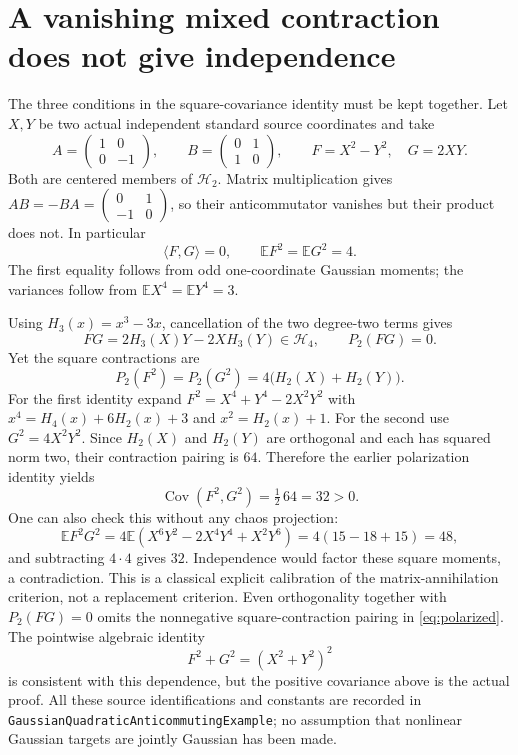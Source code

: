\documentclass[11pt]{article}
\newcommand{\E}{\mathbb E}
\newcommand{\Hh}{\mathcal H}
\newcommand{\Cov}{\operatorname{Cov}}
\begin{document}
\section{A vanishing mixed contraction does not give independence}\label{sec:anticommuting}
The three conditions in the square-covariance identity must be kept
together. Let $X,Y$ be two actual independent standard source
coordinates and take
\[
 A=\begin{pmatrix}1&0\\0&-1\end{pmatrix},\qquad
 B=\begin{pmatrix}0&1\\1&0\end{pmatrix},\qquad
 F=X^2-Y^2,\quad G=2XY.
\]
Both are centered members of $\Hh_2$. Matrix multiplication gives
$AB=-BA=\left(\begin{smallmatrix}0&1\\-1&0\end{smallmatrix}\right)$,
so their anticommutator vanishes but their product does not.
In particular
\[
 \langle F,G\rangle=0,\qquad \E F^2=\E G^2=4.
\]
The first equality follows from odd one-coordinate Gaussian moments;
the variances follow from $\E X^4=\E Y^4=3$.

Using $H_3(x)=x^3-3x$, cancellation of the two degree-two terms gives
\[
 FG=2H_3(X)Y-2XH_3(Y)\in\Hh_4,\qquad P_2(FG)=0.
\]
Yet the square contractions are
\[
 P_2(F^2)=P_2(G^2)=4\bigl(H_2(X)+H_2(Y)\bigr).
\]
For the first identity expand $F^2=X^4+Y^4-2X^2Y^2$ with
$x^4=H_4(x)+6H_2(x)+3$ and $x^2=H_2(x)+1$.
For the second use $G^2=4X^2Y^2$. Since $H_2(X)$ and $H_2(Y)$
are orthogonal and each has squared norm two, their contraction
pairing is $64$. Therefore the earlier polarization identity yields
\begin{equation}\label{eq:anticommutingcovariance}
 \Cov(F^2,G^2)=\tfrac12\,64=32>0.
\end{equation}
One can also check this without any chaos projection:
\[
 \E F^2G^2=4\E(X^6Y^2-2X^4Y^4+X^2Y^6)
 =4(15-18+15)=48,
\]
and subtracting $4\cdot4$ gives $32$. Independence would factor
these square moments, a contradiction. This is a classical explicit
calibration of the matrix-annihilation criterion, not a replacement
criterion. Even orthogonality together with $P_2(FG)=0$ omits the
nonnegative square-contraction pairing in \eqref{eq:polarized}.
The pointwise algebraic identity
\[
 F^2+G^2=(X^2+Y^2)^2
\]
is consistent with this dependence, but the positive covariance above
is the actual proof. All these source identifications and constants
are recorded in \texttt{GaussianQuadraticAnticommutingExample};
no assumption that nonlinear Gaussian targets are jointly Gaussian
has been made.
\end{document}
